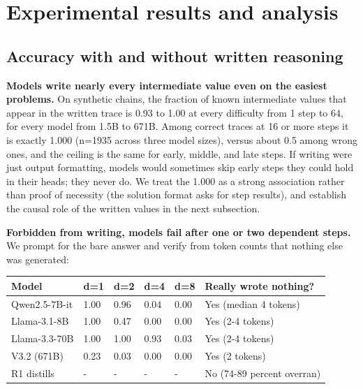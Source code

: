 \section{Experimental results and
analysis}\label{experimental-results-and-analysis}

\subsection{Accuracy with and without written
reasoning}\label{accuracy-with-and-without-written-reasoning}

\textbf{Models write nearly every intermediate value even on the easiest
problems.} On synthetic chains, the fraction of known intermediate
values that appear in the written trace is 0.93 to 1.00 at every
difficulty from 1 step to 64, for every model from 1.5B to 671B. Among
correct traces at 16 or more steps it is exactly 1.000 (n=1935 across
three model sizes), versus about 0.5 among wrong ones, and the ceiling
is the same for early, middle, and late steps. If writing were just
output formatting, models would sometimes skip early steps they could
hold in their heads; they never do. We treat the 1.000 as a strong
association rather than proof of necessity (the solution format asks for
step results), and establish the causal role of the written values in
the next subsection.

\textbf{Forbidden from writing, models fail after one or two dependent
steps.} We prompt for the bare answer and verify from token counts that
nothing else was generated:

\begin{table}[t]\centering\small
\begin{tabular}{llllll}
\toprule
Model & d=1 & d=2 & d=4 & d=8 & Really wrote nothing? \\
\midrule



Qwen2.5-7B-it & 1.00 & 0.96 & 0.04 & 0.00 & Yes (median 4 tokens) \\
Llama-3.1-8B & 1.00 & 0.47 & 0.00 & 0.00 & Yes (2-4 tokens) \\
Llama-3.3-70B & 1.00 & 1.00 & 0.93 & 0.03 & Yes (2-4 tokens) \\
V3.2 (671B) & 0.23 & 0.03 & 0.00 & 0.00 & Yes (2 tokens) \\
R1 distills & - & - & - & - & No (74-89 percent overran) \\
\bottomrule
\end{tabular}
\end{table}

